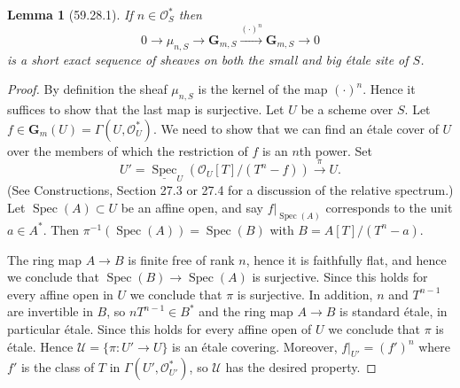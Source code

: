 \documentclass[UTF8,11pt]{ctexart}
\newtheorem*{lemma}{Lemma}
\theoremstyle{definition}
\begin{document}
\begin{lemma}[59.28.1]
If $n\in\mathcal O_S^*$ then
\[0\to\mu_{n,S}\to\mathbf G_{m,S}\xrightarrow{(\cdot)^n}\mathbf G_{m,S}\to0\]
is a short exact sequence of sheaves on both the small and big étale site of $S$.
\end{lemma}
\begin{proof}
By definition the sheaf $\mu_{n,S}$ is the kernel of the map $(\cdot)^n$. Hence it suffices to show that the last map is surjective. Let $U$ be a scheme over $S$. Let $f\in\mathbf G_m(U)=\Gamma(U,\mathcal O_U^*)$. We need to show that we can find an étale cover of $U$ over the members of which the restriction of $f$ is an $n$th power. Set
\[U'=\underline{\operatorname{Spec}}_U(\mathcal O_U[T]/(T^n-f))\xrightarrow{\pi}U.\]
(See Constructions, Section 27.3 or 27.4 for a discussion of the relative spectrum.) Let $\operatorname{Spec}(A)\subset U$ be an affine open, and say $f|_{\operatorname{Spec}(A)}$ corresponds to the unit $a\in A^*$. Then $\pi^{-1}(\operatorname{Spec}(A))=\operatorname{Spec}(B)$ with $B=A[T]/(T^n-a)$.

The ring map $A\to B$ is finite free of rank $n$, hence it is faithfully flat, and hence we conclude that $\operatorname{Spec}(B)\to\operatorname{Spec}(A)$ is surjective. Since this holds for every affine open in $U$ we conclude that $\pi$ is surjective. In addition, $n$ and $T^{n-1}$ are invertible in $B$, so $nT^{n-1}\in B^*$ and the ring map $A\to B$ is standard étale, in particular étale. Since this holds for every affine open of $U$ we conclude that $\pi$ is étale. Hence $\mathcal U=\{\pi:U'\to U\}$ is an étale covering. Moreover, $f|_{U'}=(f')^n$ where $f'$ is the class of $T$ in $\Gamma(U',\mathcal O_{U'}^*)$, so $\mathcal U$ has the desired property.
\end{proof}
\end{document}
